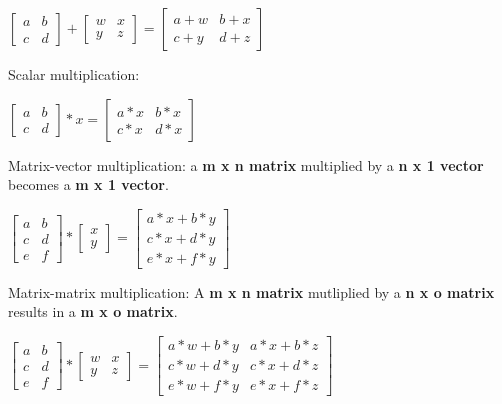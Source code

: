 \documentclass[12pt, a4paper]{article}
\begin{document}
    $\begin{bmatrix} a & b \\ c & d \end{bmatrix} + \begin{bmatrix} w & x \\ 
    y & z \end{bmatrix} = \begin{bmatrix} a+w & b+x \\ c+y & d+z \end{bmatrix}$
    
    Scalar multiplication:

    $\begin{bmatrix} a & b \\ c & d \end{bmatrix} * x = \begin{bmatrix} a*x & 
    b*x \\ c*x & d*x \end{bmatrix}$

    Matrix-vector multiplication: a \textbf{m x n matrix} multiplied by a  
    \textbf{n x 1 vector} becomes a \textbf{m x 1 vector}. 

    $\begin{bmatrix} a & b \\ c & d \\ e & f \end{bmatrix} * \begin{bmatrix} 
    x \\ y \end{bmatrix} = \begin{bmatrix} a*x+b*y \\ c*x+d*y \\ e*x+f*y
    \end{bmatrix}$

    Matrix-matrix multiplication: A \textbf{m x n matrix} mutliplied by a 
    \textbf{n x o matrix} results in a \textbf{m x o matrix}.

    $\begin{bmatrix} a & b \\ c & d \\ e & f \end{bmatrix} * \begin{bmatrix} 
    w & x \\ y & z \end{bmatrix} = \begin{bmatrix} a*w+b*y & a*x+b*z \\ 
    c*w+d*y & c*x+d*z \\ e*w+f*y & e*x+f*z \end{bmatrix}$
\end{document}
